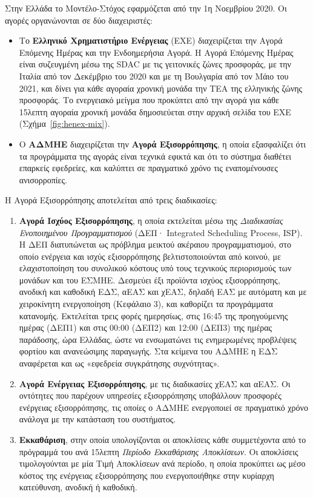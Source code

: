 Στην Ελλάδα το Μοντέλο-Στόχος εφαρμόζεται από την 1η Νοεμβρίου 2020. Οι αγορές οργανώνονται
σε δύο διαχειριστές:

\begin{itemize}
\item Το \textbf{Ελληνικό Χρηματιστήριο Ενέργειας} (ΕΧΕ) διαχειρίζεται την Αγορά Επόμενης
      Ημέρας και την Ενδοημερήσια Αγορά. Η Αγορά Επόμενης Ημέρας είναι συζευγμένη μέσω της
      SDAC με τις γειτονικές ζώνες προσφοράς, με την Ιταλία από τον Δεκέμβριο του 2020 και με
      τη Βουλγαρία από τον Μάιο του 2021, και δίνει για κάθε αγοραία χρονική μονάδα την ΤΕΑ της
      ελληνικής ζώνης προσφοράς. Το ενεργειακό μείγμα που προκύπτει από την αγορά για κάθε
      15λεπτη αγοραία χρονική μονάδα δημοσιεύεται στην αρχική σελίδα του ΕΧΕ
      (Σχήμα~\ref{fig:henex-mix}).
\item Ο \textbf{ΑΔΜΗΕ} διαχειρίζεται την \textbf{Αγορά Εξισορρόπησης}, η οποία εξασφαλίζει ότι
      τα προγράμματα της αγοράς είναι τεχνικά εφικτά και ότι το σύστημα διαθέτει επαρκείς
      εφεδρείες, και καλύπτει σε πραγματικό χρόνο τις εναπομένουσες ανισορροπίες.
\end{itemize}



Η Αγορά Εξισορρόπησης αποτελείται από τρεις διαδικασίες:

\begin{enumerate}
\item \textbf{Αγορά Ισχύος Εξισορρόπησης}, η οποία εκτελείται μέσω της \emph{Διαδικασίας
      Ενοποιημένου Προγραμματισμού} (ΔΕΠ· Integrated Scheduling Process, ISP). Η ΔΕΠ
      διατυπώνεται ως πρόβλημα μεικτού ακέραιου προγραμματισμού, στο οποίο ενέργεια και ισχύς
      εξισορρόπησης βελτιστοποιούνται από κοινού, με ελαχιστοποίηση του συνολικού κόστους υπό
      τους τεχνικούς περιορισμούς των μονάδων και του ΕΣΜΗΕ. Δεσμεύει έξι προϊόντα ισχύος
      εξισορρόπησης, ανοδική και καθοδική ΕΔΣ, αΕΑΣ και χΕΑΣ, δηλαδή ΕΑΣ με αυτόματη και με
      χειροκίνητη ενεργοποίηση (Κεφάλαιο 3), και καθορίζει τα προγράμματα κατανομής. Εκτελείται τρεις φορές ημερησίως, στις 16:45 της προηγούμενης ημέρας (ΔΕΠ1)
      και στις 00:00 (ΔΕΠ2) και 12:00 (ΔΕΠ3) της ημέρας παράδοσης, ώρα Ελλάδας, ώστε να
      ενσωματώνει τις ενημερωμένες προβλέψεις φορτίου και ανανεώσιμης παραγωγής. Στα κείμενα
      του ΑΔΜΗΕ η ΕΔΣ αναφέρεται και ως «εφεδρεία συγκράτησης συχνότητας».
\item \textbf{Αγορά Ενέργειας Εξισορρόπησης}, με τις διαδικασίες χΕΑΣ και αΕΑΣ. Οι οντότητες
      που παρέχουν υπηρεσίες εξισορρόπησης υποβάλλουν προσφορές ενέργειας εξισορρόπησης, τις
      οποίες ο ΑΔΜΗΕ ενεργοποιεί σε πραγματικό χρόνο ανάλογα με την κατάσταση του συστήματος.
\item \textbf{Εκκαθάριση}, στην οποία υπολογίζονται οι αποκλίσεις κάθε συμμετέχοντα από το
      πρόγραμμά του ανά 15λεπτη \emph{Περίοδο Εκκαθάρισης Αποκλίσεων}. Οι αποκλίσεις
      τιμολογούνται με μία Τιμή Αποκλίσεων ανά περίοδο, η οποία προκύπτει ως μέσο κόστος της
      ενέργειας εξισορρόπησης που ενεργοποιήθηκε στην κυρίαρχη κατεύθυνση, ανοδική ή καθοδική.
\end{enumerate}

